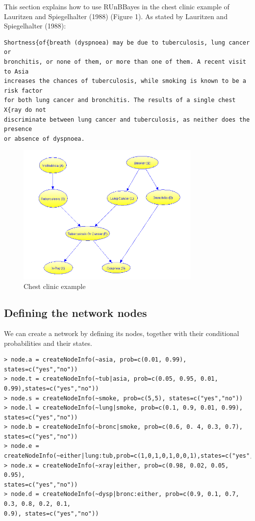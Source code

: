 \documentclass{article}
\begin{document}
This section explains how to use RUnBBayes in the chest clinic example of Lauritzen and Spiegelhalter (1988) (Figure 1). As stated by Lauritzen and Spiegelhalter (1988):

\begin{verbatim}
Shortness{of{breath (dyspnoea) may be due to tuberculosis, lung cancer or
bronchitis, or none of them, or more than one of them. A recent visit to Asia
increases the chances of tuberculosis, while smoking is known to be a risk factor
for both lung cancer and bronchitis. The results of a single chest X{ray do not
discriminate between lung cancer and tuberculosis, as neither does the presence
or absence of dyspnoea.
\end{verbatim}

\begin{figure}[ht!]
\centering
\includegraphics[width=90mm]{chest-clinic.png}
\caption{Chest clinic example}
\label{overflow}
\end{figure}


\subsection{Defining the network nodes}

We can create a network by defining its nodes, together with their conditional probabilities and their states. 

\begin{verbatim}
> node.a = createNodeInfo(~asia, prob=c(0.01, 0.99), states=c("yes","no"))
> node.t = createNodeInfo(~tub|asia, prob=c(0.05, 0.95, 0.01, 0.99),states=c("yes","no"))
> node.s = createNodeInfo(~smoke, prob=c(5,5), states=c("yes","no"))
> node.l = createNodeInfo(~lung|smoke, prob=c(0.1, 0.9, 0.01, 0.99), states=c("yes","no"))
> node.b = createNodeInfo(~bronc|smoke, prob=c(0.6, 0. 4, 0.3, 0.7), states=c("yes","no"))
> node.e = createNodeInfo(~either|lung:tub,prob=c(1,0,1,0,1,0,0,1),states=c("yes","no"))
> node.x = createNodeInfo(~xray|either, prob=c(0.98, 0.02, 0.05, 0.95), 
states=c("yes","no"))
> node.d = createNodeInfo(~dysp|bronc:either, prob=c(0.9, 0.1, 0.7, 0.3, 0.8, 0.2, 0.1, 
0.9), states=c("yes","no"))
\end{verbatim}
\end{document}
